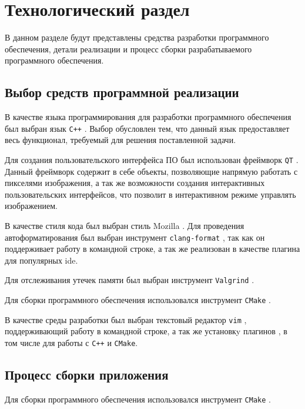 \chapter{Технологический раздел}

    В данном разделе будут представлены средства разработки программного обеспечения, детали реализации и процесс сборки разрабатываемого программного обеспечения.
    
    \section{Выбор средств программной реализации}

        В качестве языка программирования для разработки программного обеспечения был выбран язык \texttt{C++} \cite{cpp}. Выбор обусловлен тем, что данный язык предоставляет весь функционал, требуемый для решения поставленной задачи.

        Для создания пользовательского интерфейса ПО был использован фреймворк \texttt{QT} \cite{qt}. Данный фреймворк содержит в себе объекты, позволяющие напрямую работать с пикселями изображения, а  так же возможности создания интерактивных пользовательских интерфейсов, что позволит в интерактивном режиме управлять изображением.

        В качестве стиля кода был выбран стиль Mozilla \cite{fmtmozilla}. Для проведения автоформатирования был выбран инструмент \texttt{clang-format} \cite{clangfmt}, так как он поддерживает работу в командной строке, а так же реализован в качестве плагина для популярных ide.
        
        Для отслеживания утечек памяти был выбран инструмент \texttt{Valgrind} \cite{valgrind}.
        
        Для сборки программного обеспечения использовался инструмент \texttt{CMake} \cite{cmake}.
        
        В качестве среды разработки был выбран текстовый редактор \texttt{vim} \cite{vim}, поддерживающий работу в командной строке, а так же установкy плагинов \cite{vimawesome}, в том числе для работы с \texttt{C++} и \texttt{CMake}.

    \section{Процесс сборки приложения}

        Для сборки программного обеспечения использовался инструмент \texttt{CMake} \cite{cmake}.

